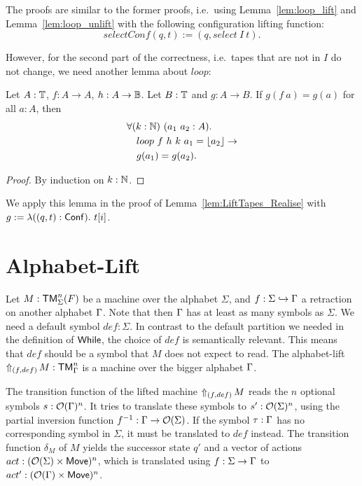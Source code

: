 The proofs are similar to the former proofs, i.e.\ using Lemma~\ref{lem:loop_lift} and Lemma~\ref{lem:loop_unlift} with the following configuration
lifting function:
\[
  selectConf(q,t) := (q, select~I~t).
\]

However, for the second part of the correctness, i.e.\ tapes that are not in $I$ do not change, we need another lemma about $loop$:

\begin{lemma}
  \label{lem:loop_map}
  Let $A:\Type$, $f:A \to A$, $h:A \to \Bool$.  Let $B:\Type$ and $g : A \to B$.  If $g(f~a)=g(a)$ for all $a:A$, then
  \begin{alignat*}{1}
    & \forall (k:\Nat)~(a_1~a_2 : A). \\
    & \quad loop~f~h~k~a_1 = \Some{a_2} \rightarrow \\
    & \quad g(a_1) = g(a_2).
  \end{alignat*}
\end{lemma}
\begin{proof}
  By induction on $k:\Nat$.
\end{proof}

We apply this lemma in the proof of Lemma~\ref{lem:LiftTapes_Realise} with $g := \lambda ((q,t):\Conf).~t[i]$.



\section{Alphabet-Lift}
\label{sec:sigma-Lift}
%

Let $M : \TM_\Sigma^n(F)$ be a machine over the alphabet $\Sigma$, and $f : \Sigma \hookrightarrow \Tau$ a retraction on another alphabet $\Tau$.
Note that then $\Tau$ has at least as many symbols as $\Sigma$.  We need a default symbol $def:\Sigma$.  In contrast to the default partition we
needed in the definition of $\While$, the choice of $def$ is semantically relevant.  This means that $def$ should be a symbol that $M$ does not expect
to read.  The alphabet-lift $\LiftAlphabet{M}{(f,def)} : \TM_\Tau^n$ is a machine over the bigger alphabet $\Tau$.

The transition function of the lifted machine $\LiftAlphabet{M}{(f,def)}$ reads the $n$ optional symbols $s : \Option(\Tau)^n$.  It tries to translate
these symbols to $s': \Option(\Sigma)^n$, using the partial inversion function $f^{-1} : \Tau \to \Option(\Sigma)$.  If the symbol $\tau:\Tau$ has no
corresponding symbol in $\Sigma$, it must be translated to $def$ instead.  The transition function $\delta_M$ of $M$ yields the successor state $q'$
and a vector of actions $act: (\Option(\Sigma) \times \MS{Move})^n$, which is translated using $f:\Sigma\to\Tau$ to
$act' : (\Option(\Tau) \times \MS{Move})^n$.

